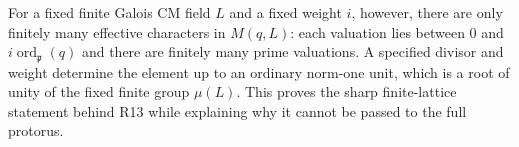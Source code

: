 For a fixed finite Galois CM field $L$ and a fixed weight $i$, however,
there are only finitely many effective characters in $M(q,L)$:
each valuation lies between $0$ and
$i\operatorname{ord}_{\mathfrak p}(q)$ and there are finitely many
prime valuations. A specified divisor and weight determine the
element up to an ordinary norm-one unit, which is a root of unity
of the fixed finite group $\mu(L)$. This proves the sharp
finite-lattice statement behind R13 while explaining why it cannot
be passed to the full protorus.
